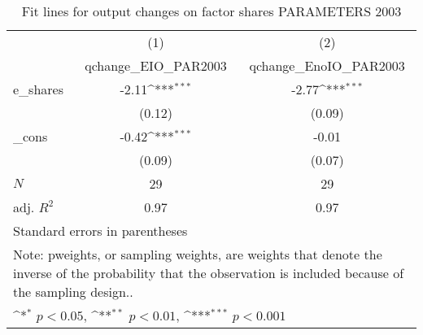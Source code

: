 \begin{table}[htbp]\centering
\def\sym#1{\ifmmode^{#1}\else\(^{#1}\)\fi}
\caption{Fit lines for output changes on factor shares PARAMETERS 2003}
\begin{tabular}{l*{2}{c}}
\toprule
            &\multicolumn{1}{c}{(1)}&\multicolumn{1}{c}{(2)}\\
            &\multicolumn{1}{c}{qchange\_EIO\_PAR2003}&\multicolumn{1}{c}{qchange\_EnoIO\_PAR2003}\\
\midrule
e\_shares    &       -2.11\sym{***}&       -2.77\sym{***}\\
            &      (0.12)         &      (0.09)         \\
\addlinespace
\_cons      &       -0.42\sym{***}&       -0.01         \\
            &      (0.09)         &      (0.07)         \\
\midrule
\(N\)       &          29         &          29         \\
adj. \(R^{2}\)&        0.97         &        0.97         \\
\bottomrule
\multicolumn{3}{l}{\footnotesize Standard errors in parentheses}\\
\multicolumn{3}{l}{\footnotesize Note: pweights, or sampling weights, are weights that denote the inverse of the probability that the observation is included because of the sampling design..}\\
\multicolumn{3}{l}{\footnotesize \sym{*} \(p<0.05\), \sym{**} \(p<0.01\), \sym{***} \(p<0.001\)}\\
\end{tabular}
\end{table}
